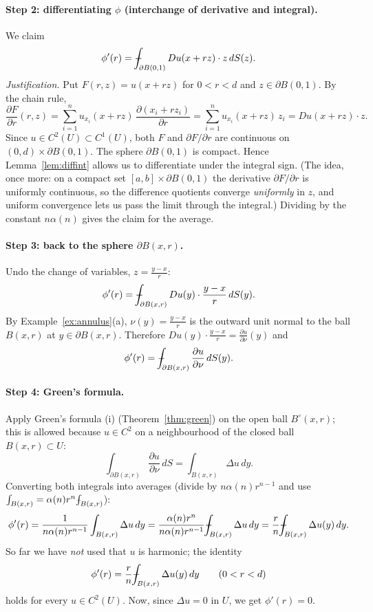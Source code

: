 \documentclass[11pt]{article}
\def\Xint#1{\mathchoice
  {\XXint\displaystyle\textstyle{#1}}%
  {\XXint\textstyle\scriptstyle{#1}}%
  {\XXint\scriptstyle\scriptscriptstyle{#1}}%
  {\XXint\scriptscriptstyle\scriptscriptstyle{#1}}%
  \!\int}
\def\XXint#1#2#3{{\setbox0=\hbox{$#1{#2#3}{\int}$}
  \vcenter{\hbox{$#2#3$}}\kern-.5\wd0}}
\def\fint{\Xint-}
\theoremstyle{plain}
\theoremstyle{definition}
\theoremstyle{remark}
\begin{document}
\paragraph{Step 2: differentiating $\phi$ (interchange of derivative and integral).} We claim
$$ \phi'(r) = \fint_{\partial B(0,1)} Du(x + rz)\cdot z\, dS(z). $$
\emph{Justification.} Put $F(r,z) = u(x + rz)$ for $0 < r < d$ and $z \in \partial B(0,1)$. By the chain rule,
$$ \frac{\partial F}{\partial r}(r,z) = \sum_{i=1}^n u_{x_i}(x+rz)\, \frac{\partial (x_i + r z_i)}{\partial r} = \sum_{i=1}^n u_{x_i}(x + rz)\, z_i = Du(x+rz)\cdot z. $$
Since $u \in C^2(U) \subset C^1(U)$, both $F$ and $\partial F/\partial r$ are continuous on $(0,d) \times \partial B(0,1)$. The sphere $\partial B(0,1)$ is compact. Hence Lemma~\ref{lem:diffint} allows us to differentiate under the integral sign. (The idea, once more: on a compact set $[a,b]\times\partial B(0,1)$ the derivative $\partial F/\partial r$ is uniformly continuous, so the difference quotients converge \emph{uniformly} in $z$, and uniform convergence lets us pass the limit through the integral.) Dividing by the constant $n\alpha(n)$ gives the claim for the average.

\paragraph{Step 3: back to the sphere $\partial B(x,r)$.} Undo the change of variables, $z = \frac{y - x}{r}$:
$$ \phi'(r) = \fint_{\partial B(x,r)} Du(y)\cdot\frac{y - x}{r}\, dS(y). $$
By Example~\ref{ex:annulus}(a), $\nu(y) = \frac{y-x}{r}$ is the outward unit normal to the ball $B(x,r)$ at $y \in \partial B(x,r)$. Therefore $Du(y)\cdot\frac{y-x}{r} = \frac{\partial u}{\partial\nu}(y)$ and
$$ \phi'(r) = \fint_{\partial B(x,r)} \frac{\partial u}{\partial \nu}\, dS(y). $$

\paragraph{Step 4: Green's formula.} Apply Green's formula (i) (Theorem~\ref{thm:green}) on the open ball $B^\circ(x,r)$; this is allowed because $u \in C^2$ on a neighbourhood of the closed ball $B(x,r) \subset U$:
$$ \int_{\partial B(x,r)} \frac{\partial u}{\partial\nu}\, dS = \int_{B(x,r)} \Delta u\, dy. $$
Converting both integrals into averages (divide by $n\alpha(n)r^{n-1}$ and use $\int_{B(x,r)} = \alpha(n) r^n \fint_{B(x,r)}$):
$$ \phi'(r) = \frac{1}{n\alpha(n)r^{n-1}}\int_{B(x,r)} \Delta u\, dy = \frac{\alpha(n)r^n}{n\alpha(n) r^{n-1}} \fint_{B(x,r)} \Delta u\, dy = \frac{r}{n}\fint_{B(x,r)} \Delta u(y)\, dy. $$
So far we have \emph{not} used that $u$ is harmonic; the identity
\begin{equation}\label{eq:phiprime}
\phi'(r) = \frac{r}{n}\fint_{B(x,r)}\Delta u(y)\, dy \qquad (0 < r < d)
\end{equation}
holds for every $u \in C^2(U)$. Now, since $\Delta u = 0$ in $U$, we get $\phi'(r) = 0$.
\end{document}
